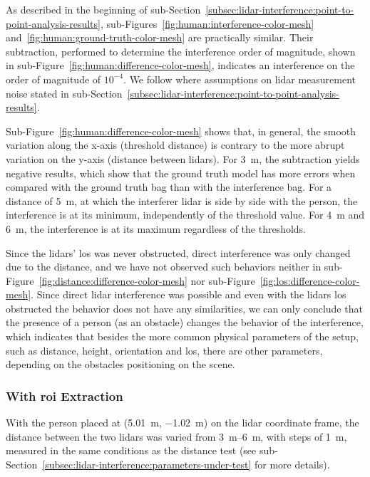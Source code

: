 As described in the beginning of sub-Section~\ref{subsec:lidar-interference:point-to-point-analysis-results}, sub-Figures~\ref{fig:human:interference-color-mesh} and~\ref{fig:human:ground-truth-color-mesh} are practically similar. Their subtraction, performed to determine the interference order of magnitude, shown in sub-Figure~\ref{fig:human:difference-color-mesh}, indicates an interference on the order of magnitude of $10^{-4}$. We follow where assumptions on \ac{lidar} measurement noise stated in sub-Section~\ref{subsec:lidar-interference:point-to-point-analysis-results}.

Sub-Figure~\ref{fig:human:difference-color-mesh} shows that, in general, the smooth variation along the x-axis (threshold distance) is contrary to the more abrupt variation on the y-axis (distance between \acp{lidar}). For \SI{3}{\meter}, the subtraction yields negative results, which show that the ground truth model has more errors when compared with the ground truth bag than with the interference bag. For a distance of \SI{5}{\meter}, at which the interferer \ac{lidar} is side by side with the person, the interference is at its minimum, independently of the threshold value. For \SI{4}{\meter} and \SI{6}{\meter}, the interference is at its maximum regardless of the thresholds. 

Since the \acp{lidar}' \ac{los} was never obstructed, direct interference was only changed due to the distance, and we have not observed such behaviors neither in sub-Figure~\ref{fig:distance:difference-color-mesh} nor sub-Figure~\ref{fig:los:difference-color-mesh}. Since direct  \ac{lidar} interference was possible and even with the \acp{lidar} \ac{los} obstructed the behavior does not have any similarities, we can only conclude that the presence of a person (as an obstacle) changes the behavior of the interference, which indicates that besides the more common physical parameters of the setup, such as distance, height, orientation and \ac{los}, there are other parameters, depending on the obstacles positioning on the scene.


\subsubsection{With \acs{roi} Extraction}
With the person placed at (\SI{5.01}{\meter}, \SI{-1.02}{\meter}) on the \ac{lidar} coordinate frame, the distance between the two \acp{lidar} was varied from \SIrange{3}{6}{\meter}, with steps of \SI{1}{\meter}, measured in the same conditions as the distance test (see sub-Section~\ref{subsec:lidar-interference:parameters-under-test} for more details).

